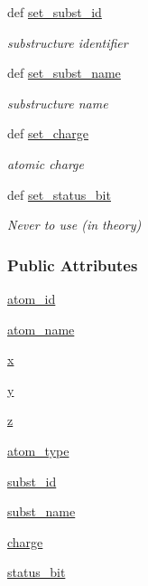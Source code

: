 \begin{DoxyCompactItemize}
def \hyperlink{classforcebalance_1_1Mol2_1_1mol2__atom_ae879ba27197a573b6e3e1e97f0b76aff}{set\-\_\-subst\-\_\-id}
\begin{DoxyCompactList}\small\item\em substructure identifier \end{DoxyCompactList}\item 
def \hyperlink{classforcebalance_1_1Mol2_1_1mol2__atom_af149e1d049adee0318eef510a8d32f9c}{set\-\_\-subst\-\_\-name}
\begin{DoxyCompactList}\small\item\em substructure name \end{DoxyCompactList}\item 
def \hyperlink{classforcebalance_1_1Mol2_1_1mol2__atom_abfe80eac2952ad867d87e8b6e64f3c09}{set\-\_\-charge}
\begin{DoxyCompactList}\small\item\em atomic charge \end{DoxyCompactList}\item 
def \hyperlink{classforcebalance_1_1Mol2_1_1mol2__atom_a2b8855f5349976b26917fee353618354}{set\-\_\-status\-\_\-bit}
\begin{DoxyCompactList}\small\item\em \-Never to use (in theory) \end{DoxyCompactList}\end{DoxyCompactItemize}
\subsubsection*{\-Public \-Attributes}
\begin{DoxyCompactItemize}
\item 
\hyperlink{classforcebalance_1_1Mol2_1_1mol2__atom_aeb2c6b3c9cc6b3e36001471a205d0865}{atom\-\_\-id}
\item 
\hyperlink{classforcebalance_1_1Mol2_1_1mol2__atom_a7afa64284bde99df1325e0e200e1f5c1}{atom\-\_\-name}
\item 
\hyperlink{classforcebalance_1_1Mol2_1_1mol2__atom_a90944a47bc931c549c081131cffc20fa}{x}
\item 
\hyperlink{classforcebalance_1_1Mol2_1_1mol2__atom_ac2517b8868af803f8089d58acdfc93d7}{y}
\item 
\hyperlink{classforcebalance_1_1Mol2_1_1mol2__atom_ab45e46b303b3a3166c03daeead9b47c3}{z}
\item 
\hyperlink{classforcebalance_1_1Mol2_1_1mol2__atom_a7a8c5ec4e604d7f4f8bed4756602ce0c}{atom\-\_\-type}
\item 
\hyperlink{classforcebalance_1_1Mol2_1_1mol2__atom_a0cb94707f171ffdd18d2806174d344b1}{subst\-\_\-id}
\item 
\hyperlink{classforcebalance_1_1Mol2_1_1mol2__atom_a389def1674ef517b03ec35cb308d551a}{subst\-\_\-name}
\item 
\hyperlink{classforcebalance_1_1Mol2_1_1mol2__atom_ace39fb36d82f4afa291c57cdf99c1e1e}{charge}
\item 
\hyperlink{classforcebalance_1_1Mol2_1_1mol2__atom_a24beeeba3e830703f13e539ed5a53d8d}{status\-\_\-bit}
\end{DoxyCompactItemize}


